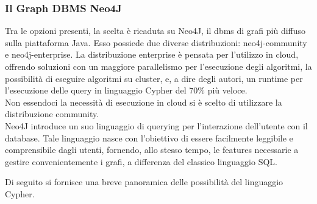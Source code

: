 \documentclass[a4paper, 12pt]{article}
\begin{document}
\subsubsection{Il Graph DBMS Neo4J}
Tra le opzioni presenti, la scelta è ricaduta su Neo4J, il dbms di grafi più diffuso sulla piattaforma Java. Esso possiede due diverse distribuzioni: neo4j-community e neo4j-enterprise. La distribuzione enterprise è pensata per l'utilizzo in cloud, offrendo soluzioni con un maggiore parallelismo per l'esecuzione degli algoritmi, la possibilità di eseguire algoritmi su cluster, e, a dire degli autori, un runtime per l'esecuzione delle query in linguaggio Cypher del 70\% più veloce. \\
Non essendoci la necessità di esecuzione in cloud si è scelto di utilizzare la distribuzione community. \\
Neo4J introduce un suo linguaggio di querying per l'interazione dell'utente con il database. Tale linguaggio nasce con l'obiettivo di essere facilmente leggibile e comprensibile dagli utenti, fornendo, allo stesso tempo, le features necessarie a gestire convenientemente i grafi, a differenza del classico linguaggio SQL.
\par
Di seguito si fornisce una breve panoramica delle possibilità del linguaggio Cypher.
\end{document}
